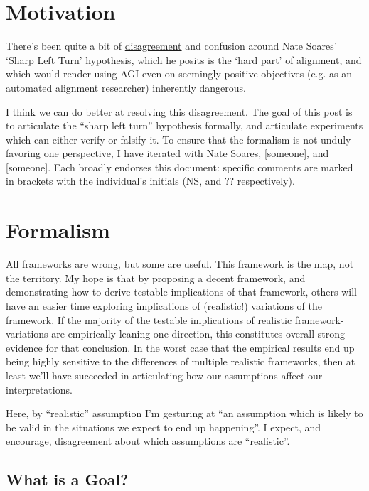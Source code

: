 \documentclass{article}
\begin{document}
\section{Motivation}
There's been quite a bit of \href{https://www.alignmentforum.org/posts/iy2o4nQj9DnQD7Yhj/discussion-with-nate-soares-on-a-key-alignment-difficulty}{disagreement} and confusion around Nate Soares' `Sharp Left Turn' hypothesis, which he posits is the `hard part' of alignment, and which would render using AGI even on seemingly positive objectives (e.g. as an automated alignment researcher) inherently dangerous.

I think we can do better at resolving this disagreement. 
The goal of this post is to articulate the “sharp left turn” hypothesis formally, and articulate experiments which can either verify or falsify it. 
To ensure that the formalism is not unduly favoring one perspective, I have iterated with Nate Soares, [someone], and [someone]. Each broadly endorses this document: specific comments are marked in brackets with the individual’s initials (NS, and ?? respectively).

\section{Formalism}

All frameworks are wrong, but some are useful. This framework is the map, not the territory. My hope is that by proposing a decent framework, and demonstrating how to derive testable implications of that framework, others will have an easier time exploring implications of (realistic!) variations of the framework. If the majority of the testable implications of realistic framework-variations are empirically leaning one direction, this constitutes overall strong evidence for that conclusion. In the worst case that the empirical results end up being highly sensitive to the differences of multiple realistic frameworks, then at least we’ll have succeeded in articulating how our assumptions affect our interpretations.

Here, by “realistic” assumption I’m gesturing at “an assumption which is likely to be valid in the situations we expect to end up happening”. I expect, and encourage, disagreement about which assumptions are “realistic”.

\subsection{What is a Goal?}
\end{document}
